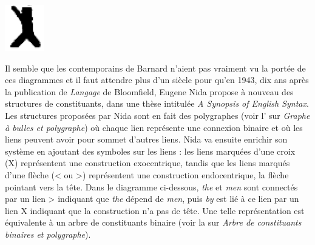 {    \includegraphics[width=\textwidth]{figures/vol1syntaxe2-img022.png}

    Il semble que les contemporains de Barnard n’aient pas vraiment vu la portée de ces diagrammes et il faut attendre plus d’un siècle pour qu’en 1943, dix ans après la publication de \textit{Langage} de Bloomfield, Eugene Nida propose à nouveau des structures de constituants, dans une thèse intitulée \textit{A Synopsis of English Syntax}. Les structures proposées par Nida sont en fait des polygraphes (voir l’ sur \textit{Graphe à bulles et polygraphe}) où chaque lien représente une connexion binaire et où les liens peuvent avoir pour sommet d’autres liens. Nida va ensuite enrichir son système en ajoutant des symboles sur les liens : les liens marquées d’une croix (X) représentent une construction exocentrique, tandis que les liens marqués d’une flèche (< ou >) représentent une construction endocentrique, la flèche pointant vers la tête. Dans le diagramme ci-dessous, \textit{the} et \textit{men} sont connectés par un lien > indiquant que \textit{the} dépend de \textit{men}, puis \textit{by} est lié à ce lien par un lien X indiquant que la construction n’a pas de tête. Une telle représentation est équivalente à un arbre de constituants binaire (voir la  sur \textit{Arbre de constituants binaires et polygraphe}).


}
